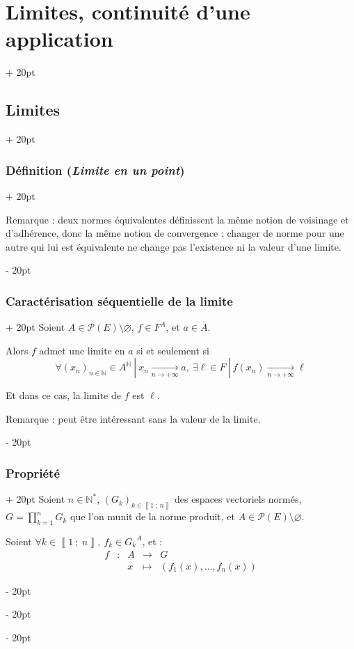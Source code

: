 \documentclass[a4paper, 12pt, twoside]{article}
\newcommand{\N}{\mathbb{N}} %
\newcommand{\nset}[2]{\left\llbracket #1\ ;\ #2 \right\rrbracket}
\newcommand{\cj}[1]{\overline{#1}} %
\newcommand{\tendsto}[1]{\xrightarrow[#1]{}}
\newcommand{\lr}[1]{\left( #1 \right)}
\newcommand{\ind}[1][20pt]{\advance\leftskip + #1}
\newcommand{\deind}[1][20pt]{\advance\leftskip - #1}
\newenvironment{indt}[2][20pt]{#2 \par \ind[#1]}{\par \deind} %
\begin{document}
\begin{indt}{\section{Limites, continuité d'une application}}
\begin{indt}{\subsection{Limites}}
\begin{indt}{\subsubsection{Définition (\textit{Limite en un point})}}
                \vspace{12pt}
                
                Remarque : deux normes équivalentes définissent la même notion de voisinage et d'adhérence, donc la même notion de convergence : changer de norme pour une autre qui lui est équivalente ne change pas l'existence ni la valeur d'une limite.
            \end{indt}

            \vspace{12pt}
            
            \begin{indt}{\subsubsection{Caractérisation séquentielle de la limite}}
                Soient $A \in \mathcal P(E) \setminus \varnothing$, $f \in F^A$, et $a \in \cj A$.

                Alors $f$ admet une limite en $a$ si et seulement si
                \[
                    \forall (x_n)_{n \in \N} \in A^\N\ |\ x_n \tendsto{n \to +\infty} a,\
                    \exists \ell \in F\ |\ f(x_n) \tendsto{n \to +\infty} \ell
                \]

                Et dans ce cas, la limite de $f$ est $\ell$.

                \vspace{12pt}
                
                Remarque : peut être intéressant sans la valeur de la limite.
            \end{indt}

            \vspace{12pt}
            
            \begin{indt}{\subsubsection{Propriété}}
                Soient $n \in \N^*$, $(G_k)_{k \in \nset 1 n}$ des espaces vectoriels normés, $\displaystyle G = \prod_{k = 1}^n G_k$ que l'on munit de la norme produit, et $A \in \mathcal P(E) \setminus \varnothing$.

                Soient $\forall k \in \nset 1 n,\ f_k \in {G_k}^A$, et :
                \[
                    \begin{array}{ccccc}
                        f & : & A & \longrightarrow & G
                        \\
                          && x & \longmapsto & \lr{f_1(x), \ldots, f_n(x)}
                    \end{array}
                \]


\end{indt}
\end{indt}
\end{indt}
\end{document}
